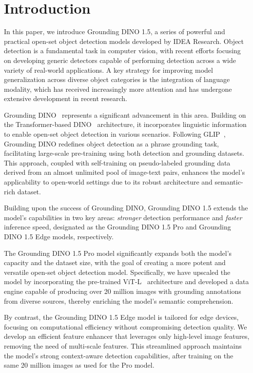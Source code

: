\section{Introduction}
In this paper, we introduce Grounding DINO 1.5, a series of powerful and practical open-set object detection models developed by IDEA Research. 
Object detection is a fundamental task in computer vision, with recent efforts focusing on developing generic detectors capable of performing detection across a wide variety of real-world applications. 
A key strategy for improving model generalization across diverse object categories is the integration of language modality, which has received increasingly more attention and has undergone extensive development in recent research.


Grounding DINO~\cite{GroundingDINO} represents a significant advancement in this area. 
Building on the Transformer-based DINO~\cite{DINO} architecture, it incorporates linguistic information to enable open-set object detection in various scenarios. 
Following GLIP~\cite{GLIP}, Grounding DINO redefines object detection as a phrase grounding task, facilitating large-scale pre-training using both detection and grounding datasets. 
This approach, coupled with self-training on pseudo-labeled grounding data derived from an almost unlimited pool of image-text pairs, enhances the model’s applicability to open-world settings due to its robust architecture and semantic-rich dataset.


Building upon the success of Grounding DINO, Grounding DINO 1.5 extends the model's capabilities in two key areas: \emph{stronger} detection performance and \emph{faster} inference speed, designated as the Grounding DINO 1.5 Pro and Grounding DINO 1.5 Edge models, respectively.

The Grounding DINO 1.5 Pro model significantly expands both the model's capacity and the dataset size, with the goal of creating a more potent and versatile open-set object detection model. Specifically, we have upscaled the model by incorporating the pre-trained ViT-L~\cite{EVA-02} architecture and developed a data engine capable of producing over 20 million images with grounding annotations from diverse sources, thereby enriching the model's semantic comprehension. %

By contrast, the Grounding DINO 1.5 Edge model is tailored for edge devices, focusing on computational efficiency without compromising detection quality. We develop an efficient feature enhancer that leverages only high-level image features, removing the need of multi-scale features. This streamlined approach maintains the model's strong context-aware detection capabilities, after training on the same 20 million images as used for the Pro model.


